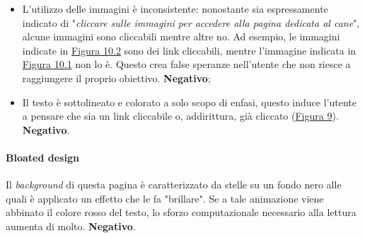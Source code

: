 \documentclass[../rapporto-usabilita.tex]{subfiles}
\begin{document}
	 	\begin{itemize}
	 	
	 		\item L'utilizzo delle immagini è inconsistente: nonostante sia espressamente indicato di "\textit{cliccare sulle immagini per accedere alla pagina dedicata al cane}", alcune immagini sono cliccabili mentre altre no.  Ad esempio, le immagini indicate in \hyperref[fig:adults1]{Figura 10.2} sono dei link cliccabili, mentre l'immagine indicata in \hyperref[fig:adults1]{Figura 10.1} non lo è. Questo crea false speranze nell'utente che non riesce a raggiungere il proprio obiettivo. \textbf{Negativo};
	 		
	 		\item Il testo è sottolineato e colorato a solo scopo di enfasi, questo induce l'utente a pensare che sia un link cliccabile o, addirittura, già cliccato (\hyperref[fig:adults]{Figura 9}). \textbf{Negativo}.
	 	
	 	\end{itemize}
	
	\paragraph{Bloated design}
	Il \textit{background} di questa pagina è caratterizzato da stelle su un fondo nero alle quali è applicato un effetto che le fa "brillare". Se a tale animazione viene abbinato il colore rosso del testo, lo sforzo computazionale necessario alla lettura aumenta di molto. \textbf{Negativo}.
	
\end{document}
